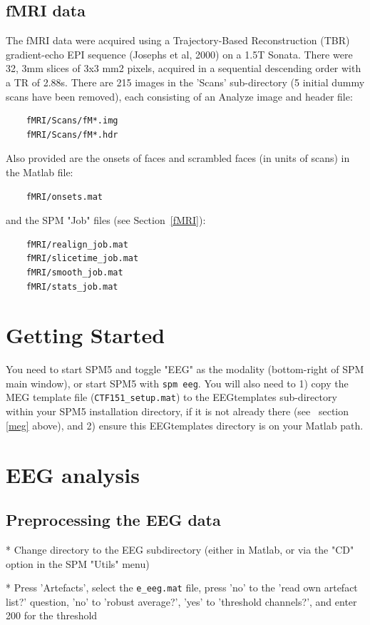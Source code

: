 \subsection{fMRI data}

The fMRI data were acquired using a Trajectory-Based Reconstruction (TBR) gradient-echo EPI sequence (Josephs et al, 2000) on a 1.5T Sonata. There were 32, 3mm slices of 3x3 mm2 pixels, acquired in a sequential descending order with a TR of 2.88s. There are 215 images in the 'Scans' sub-directory (5 initial dummy scans have been removed), each consisting of an Analyze image and header file:
\begin{verbatim}
	fMRI/Scans/fM*.img	
	fMRI/Scans/fM*.hdr
\end{verbatim}
Also provided are the onsets of faces and scrambled faces (in units of scans) in the Matlab file:
\begin{verbatim}
	fMRI/onsets.mat	
\end{verbatim}
and the SPM "Job" files (see Section~\ref{fMRI}):
\begin{verbatim}
	fMRI/realign_job.mat
	fMRI/slicetime_job.mat
	fMRI/smooth_job.mat
	fMRI/stats_job.mat
\end{verbatim}

\section{Getting Started}

You need to start SPM5 and toggle "EEG" as the modality (bottom-right of SPM main window), or start SPM5 with \verb!spm eeg!.
You will also need to 1) copy the MEG template file (\verb!CTF151_setup.mat!) to the EEGtemplates sub-directory within your SPM5 installation directory, if it is not already there (see ~section \ref{meg} above), and 2) ensure this EEGtemplates directory is on your Matlab path.


\section{EEG analysis}

\subsection{Preprocessing the EEG data}

* Change directory to the EEG subdirectory (either in Matlab, or via the "CD" option in the SPM "Utils" menu)

* Press 'Artefacts', select the \verb!e_eeg.mat! file, press 'no' to the 'read own artefact list?' question, 'no' to 'robust average?', 'yes' to 'threshold channels?', and enter 200 for the threshold

